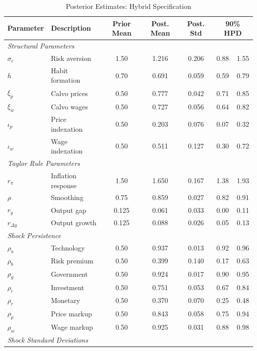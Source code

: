 \documentclass[12pt]{article}
\begin{document}
\begin{table}[H]
\centering
\caption{Posterior Estimates: Hybrid Specification}
\label{tab:posterior}
\scriptsize
\setlength{\tabcolsep}{3pt}
\renewcommand{\arraystretch}{0.95}
\begin{tabular}{@{}llccccc@{}}
\toprule
Parameter & Description & Prior Mean & Post. Mean & Post. Std & \multicolumn{2}{c}{90\% HPD} \\
\midrule
\multicolumn{7}{l}{\textit{Structural Parameters}} \\
$\sigma_c$ & Risk aversion & 1.50 & 1.216 & 0.206 & 0.88 & 1.55 \\
$h$ & Habit formation & 0.70 & 0.691 & 0.059 & 0.59 & 0.79 \\
$\xi_p$ & Calvo prices & 0.50 & 0.777 & 0.042 & 0.71 & 0.85 \\
$\xi_w$ & Calvo wages & 0.50 & 0.727 & 0.056 & 0.64 & 0.82 \\
$\iota_p$ & Price indexation & 0.50 & 0.203 & 0.076 & 0.07 & 0.32 \\
$\iota_w$ & Wage indexation & 0.50 & 0.511 & 0.127 & 0.30 & 0.72 \\[2pt]
\multicolumn{7}{l}{\textit{Taylor Rule Parameters}} \\
$r_\pi$ & Inflation response & 1.50 & 1.650 & 0.167 & 1.38 & 1.93 \\
$\rho$ & Smoothing & 0.75 & 0.859 & 0.027 & 0.82 & 0.91 \\
$r_y$ & Output gap & 0.125 & 0.061 & 0.033 & 0.00 & 0.11 \\
$r_{\Delta y}$ & Output growth & 0.125 & 0.088 & 0.026 & 0.05 & 0.13 \\[2pt]
\multicolumn{7}{l}{\textit{Shock Persistence}} \\
$\rho_a$ & Technology & 0.50 & 0.937 & 0.013 & 0.92 & 0.96 \\
$\rho_b$ & Risk premium & 0.50 & 0.399 & 0.140 & 0.17 & 0.63 \\
$\rho_g$ & Government & 0.50 & 0.924 & 0.017 & 0.90 & 0.95 \\
$\rho_i$ & Investment & 0.50 & 0.751 & 0.053 & 0.67 & 0.84 \\
$\rho_r$ & Monetary & 0.50 & 0.370 & 0.070 & 0.25 & 0.48 \\
$\rho_p$ & Price markup & 0.50 & 0.843 & 0.058 & 0.75 & 0.94 \\
$\rho_w$ & Wage markup & 0.50 & 0.925 & 0.031 & 0.88 & 0.98 \\[2pt]
\multicolumn{7}{l}{\textit{Shock Standard Deviations}} \\

\end{tabular}
\end{table}
\end{document}
